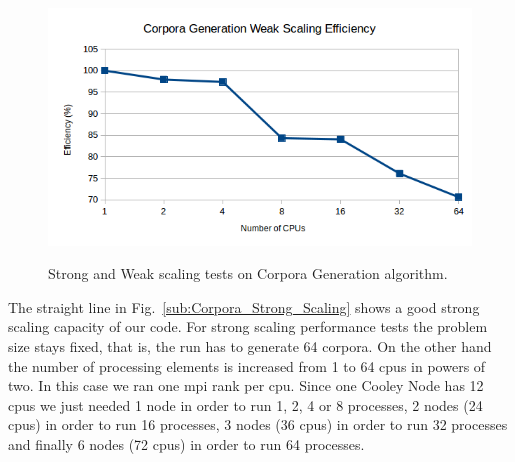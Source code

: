 \documentclass[10pt,journal,compsoc]{IEEEtran}
\begin{document}
\begin{figure}[tb]
{	\includegraphics[width=0.49\linewidth]{Corpora_Weak_Scaling_Efficiency.png}}
	\caption{Strong and Weak scaling tests on Corpora Generation algorithm.}
  \label{fig:Corpora_Scaling} 
\end{figure}


The straight line in Fig.~\ref{sub:Corpora_Strong_Scaling} shows a good strong scaling capacity of our code. For strong scaling performance tests the problem size stays fixed, that is, the run has to generate 64 corpora. On the other hand the number of processing elements is increased from 1 to 64 \glspl{cpu} in powers of two. In this case we ran one \gls{mpi} rank per \gls{cpu}. Since one Cooley Node has 12 \glspl{cpu} we just needed 1 node in order to run 1, 2, 4 or 8 processes, 2 nodes (24 \glspl{cpu}) in order to run 16 processes, 3 nodes (36 \glspl{cpu}) in order to run 32 processes and finally 6 nodes (72 \glspl{cpu}) in order to run 64 processes.
\end{document}
